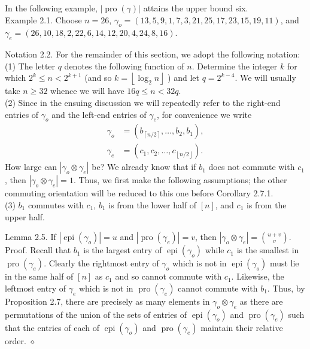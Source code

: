 \documentclass[10pt]{article}
\newcommand{\proofend}{\hfill\(\diamond\)}
\begin{document}
In the following example, $|\operatorname{pro}(\gamma)|$ attains the upper bound six.\\
Example 2.1. Choose $n=26$, $\gamma_{o}=(13,5,9,1,7,3,21,25,17,23,15,19,11)$, and $\gamma_{e}=(26,10,18,2,22,6,14,12,20,4,24,8,16)$.

Notation 2.2. For the remainder of this section, we adopt the following notation:\\
(1) The letter $q$ denotes the following function of $n$. Determine the integer $k$ for which $2^{k} \leq n<2^{k+1}$ (and so $k=\left\lfloor\log _{2} n\right\rfloor$ ) and let $q=2^{k-4}$. We will usually take $n \geq 32$ whence we will have $16 q \leq n<32 q$.\\
(2) Since in the ensuing discussion we will repeatedly refer to the right-end entries of $\gamma_{o}$ and the left-end entries of $\gamma_{e}$, for convenience we write
\[
\begin{aligned}
\gamma_{o}&=\left(b_{\left\lceil n/2\right\rceil},\ldots,b_{2},b_{1}\right),\\
\gamma_{e}&=\left(c_{1},c_{2},\ldots,c_{\left\lfloor n/2\right\rfloor}\right).
\end{aligned}
\]
How large can $\left|\gamma_{o} \otimes \gamma_{e}\right|$ be? We already know that if $b_{1}$ does not commute with $c_{1}$, then $\left|\gamma_{o} \otimes \gamma_{e}\right|=1$. Thus, we first make the following assumptions; the other commuting orientation will be reduced to this one before Corollary 2.7.1.\\
(3) $b_{1}$ commutes with $c_{1}$, $b_{1}$ is from the lower half of $[n]$, and $c_{1}$ is from the upper half.

Lemma 2.5. If $\left|\operatorname{epi}\left(\gamma_{o}\right)\right|=u$ and $\left|\operatorname{pro}\left(\gamma_{e}\right)\right|=v$, then $\left|\gamma_{o} \otimes \gamma_{e}\right|=\binom{u+v}{v}$.
Proof. Recall that $b_{1}$ is the largest entry of $\operatorname{epi}\left(\gamma_{o}\right)$ while $c_{1}$ is the smallest in $\operatorname{pro}\left(\gamma_{e}\right)$. Clearly the rightmost entry of $\gamma_{o}$ which is not in $\operatorname{epi}\left(\gamma_{o}\right)$ must lie in the same half of $[n]$ as $c_{1}$ and so cannot commute with $c_{1}$. Likewise, the leftmost entry of $\gamma_{e}$ which is not in $\operatorname{pro}\left(\gamma_{e}\right)$ cannot commute with $b_{1}$. Thus, by Proposition 2.7, there are precisely as many elements in $\gamma_{o} \otimes \gamma_{e}$ as there are permutations of the union of the sets of entries of $\operatorname{epi}\left(\gamma_{o}\right)$ and $\operatorname{pro}\left(\gamma_{e}\right)$ such that the entries of each of $\operatorname{epi}\left(\gamma_{o}\right)$ and $\operatorname{pro}\left(\gamma_{e}\right)$ maintain their relative order. \proofend
\end{document}
